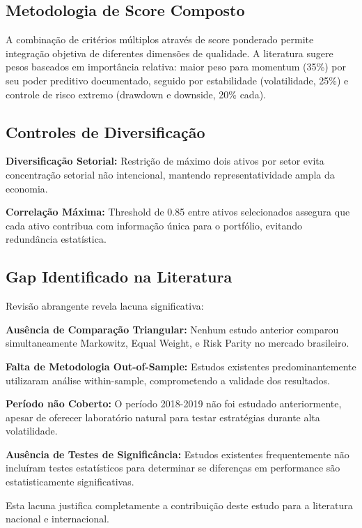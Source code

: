 \subsection{Metodologia de Score Composto}

A combinação de critérios múltiplos através de score ponderado permite integração objetiva de diferentes dimensões de qualidade. A literatura sugere pesos baseados em importância relativa: maior peso para momentum (35\%) por seu poder preditivo documentado, seguido por estabilidade (volatilidade, 25\%) e controle de risco extremo (drawdown e downside, 20\% cada).

\subsection{Controles de Diversificação}

\textbf{Diversificação Setorial:} Restrição de máximo dois ativos por setor evita concentração setorial não intencional, mantendo representatividade ampla da economia.

\textbf{Correlação Máxima:} Threshold de 0.85 entre ativos selecionados assegura que cada ativo contribua com informação única para o portfólio, evitando redundância estatística.

\subsection{Gap Identificado na Literatura}

Revisão abrangente revela lacuna significativa:

\textbf{Ausência de Comparação Triangular:} Nenhum estudo anterior comparou simultaneamente Markowitz, Equal Weight, e Risk Parity no mercado brasileiro.

\textbf{Falta de Metodologia Out-of-Sample:} Estudos existentes predominantemente utilizaram análise within-sample, comprometendo a validade dos resultados.

\textbf{Período não Coberto:} O período 2018-2019 não foi estudado anteriormente, apesar de oferecer laboratório natural para testar estratégias durante alta volatilidade.

\textbf{Ausência de Testes de Significância:} Estudos existentes frequentemente não incluíram testes estatísticos para determinar se diferenças em performance são estatisticamente significativas.

Esta lacuna justifica completamente a contribuição deste estudo para a literatura nacional e internacional.